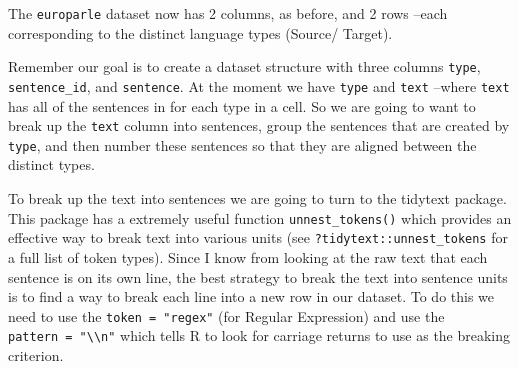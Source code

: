 \documentclass[
]{article}
\newenvironment{Shaded}{\begin{snugshade}}{\end{snugshade}}
\newcommand{\AttributeTok}[1]{\textcolor[rgb]{0.77,0.63,0.00}{#1}}
\newcommand{\CommentTok}[1]{\textcolor[rgb]{0.56,0.35,0.01}{\textit{#1}}}
\newcommand{\ConstantTok}[1]{\textcolor[rgb]{0.00,0.00,0.00}{#1}}
\newcommand{\FunctionTok}[1]{\textcolor[rgb]{0.00,0.00,0.00}{#1}}
\newcommand{\NormalTok}[1]{#1}
\newcommand{\OtherTok}[1]{\textcolor[rgb]{0.56,0.35,0.01}{#1}}
\newcommand{\SpecialCharTok}[1]{\textcolor[rgb]{0.00,0.00,0.00}{#1}}
\newcommand{\StringTok}[1]{\textcolor[rgb]{0.31,0.60,0.02}{#1}}
\begin{document}
The \texttt{europarle} dataset now has 2 columns, as before, and 2 rows --each corresponding to the distinct language types (Source/ Target).

Remember our goal is to create a dataset structure with three columns \texttt{type}, \texttt{sentence\_id}, and \texttt{sentence}. At the moment we have \texttt{type} and \texttt{text} --where \texttt{text} has all of the sentences in for each type in a cell. So we are going to want to break up the \texttt{text} column into sentences, group the sentences that are created by \texttt{type}, and then number these sentences so that they are aligned between the distinct types.

To break up the text into sentences we are going to turn to the tidytext package. This package has a extremely useful function \texttt{unnest\_tokens()} which provides an effective way to break text into various units (see \texttt{?tidytext::unnest\_tokens} for a full list of token types). Since I know from looking at the raw text that each sentence is on its own line, the best strategy to break the text into sentence units is to find a way to break each line into a new row in our dataset. To do this we need to use the \texttt{token\ =\ "regex"} (for Regular Expression) and use the \texttt{pattern\ =\ "\textbackslash{}\textbackslash{}n"} which tells R to look for carriage returns to use as the breaking criterion.

\begin{Shaded}
\end{Shaded}
\end{document}
